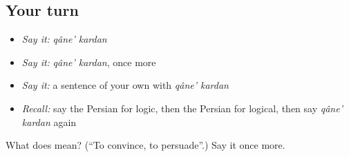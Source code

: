 \subsection*{Your turn}
\begin{itemize}
\raggedright
  \item \emph{Say it:} \emph{qâne' kardan}
  \item \emph{Say it:} \emph{qâne' kardan}, once more
  \item \emph{Say it:} a sentence of your own with \emph{qâne' kardan}
  \item \emph{Recall:} say the Persian for logic, then the Persian for logical, then say \emph{qâne' kardan} again
\end{itemize}

\begin{tcolorbox}[breakable,colback=teal!4,colframe=teal!35!black,title={Before you move on}]
What does   mean? (\textquotedblleft{}To convince, to persuade\textquotedblright{}.) Say it once more.
\end{tcolorbox}
